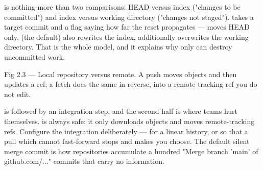  is nothing more than two comparisons: HEAD versus index ("changes to be committed") and index versus working directory ("changes not staged").  takes a target commit and a flag saying how far the reset propagates ---  moves HEAD only,  (the default) also rewrites the index,  additionally overwrites the working directory. That is the whole model, and it explains why only  can destroy uncommitted work.

\begin{wbfigure}{Fig 2.3 — Local repository versus remote. A push moves objects and then updates a ref; a fetch does the same in reverse, into a remote-tracking ref you do not edit.}
\end{wbfigure}

\begin{seniornote}
 is  followed by an integration step, and the second half is where teams hurt themselves.  is always safe: it only downloads objects and moves remote-tracking refs. Configure the integration deliberately ---  for a linear history, or  so that a pull which cannot fast-forward stops and makes you choose. The default silent merge commit is how repositories accumulate a hundred "Merge branch 'main' of github.com/..." commits that carry no information.
\end{seniornote}

